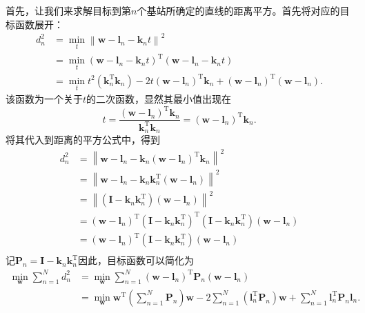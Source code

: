 首先，让我们来求解目标到第\( n \)个基站所确定的直线的距离平方。首先将对应的目标函数展开：
\[
    \begin{split}
        d_n^2 & = \min_{t} \left\| \bm{w} - \bm{l}_n - \bm{k}_n t \right\|^2                                                                                            \\
              & = \min_{t} (\bm{w} - \bm{l}_n - \bm{k}_n t)^{\mathrm{T}} (\bm{w} - \bm{l}_n - \bm{k}_n t)                                                               \\
              & = \min_{t} t^2 (\bm{k}_n^{\mathrm{T}} \bm{k}_n)  - 2 t (\bm{w} - \bm{l}_n)^{\mathrm{T}}\bm{k}_n + (\bm{w} - \bm{l}_n)^{\mathrm{T}} (\bm{w} - \bm{l}_n).
    \end{split}
\]
该函数为一个关于\( t \)的二次函数，显然其最小值出现在
\[
    t = \frac{(\bm{w} - \bm{l}_n)^{\mathrm{T}} \bm{k}_n}{\bm{k}_n^{\mathrm{T}} \bm{k}_n} = (\bm{w} - \bm{l}_n)^{\mathrm{T}} \bm{k}_n.
\]
将其代入到距离的平方公式中，得到
\[
    \begin{split}
        d_n^2 & = \left\|\bm{w} - \bm{l}_n - \bm{k}_n(\bm{w} - \bm{l}_n)^{\mathrm{T}} \bm{k}_n\right\|^2                                                                                               \\
              & = \left\| \bm{w} - \bm{l}_n - \bm{k}_n \bm{k}_n^{\mathrm{T}} (\bm{w} - \bm{l}_n) \right\|^2                                                                                            \\
              & = \left\| \left(\mathbf{I} - \bm{k}_n \bm{k}_n^{\mathrm{T}}\right) ( \bm{w} - \bm{l}_n) \right\|^2                                                                                     \\
              & = (\bm{w} - \bm{l}_n)^{\mathrm{T}} \left(\mathbf{I} - \bm{k}_n \bm{k}_n^{\mathrm{T}}\right)^{\mathrm{T}} \left(\mathbf{I} - \bm{k}_n \bm{k}_n^{\mathrm{T}}\right) ( \bm{w} - \bm{l}_n) \\
              & = (\bm{w} - \bm{l}_n)^{\mathrm{T}} \left(\mathbf{I} - \bm{k}_n \bm{k}_n^{\mathrm{T}}\right) ( \bm{w} - \bm{l}_n)                                                                       \\
    \end{split}
\]
记\( \mathbf{P}_n = \mathbf{I} - \bm{k}_n \bm{k}_n^{\mathrm{T}} \)因此，目标函数可以简化为
\[
    \begin{split}
        \min_{\bm{w}} \sum_{n=1}^{N} d_n^2 & = \min_{\bm{w}} \sum_{n=1}^{N} (\bm{w} - \bm{l}_n)^{\mathrm{T}} \mathbf{P}_n ( \bm{w} - \bm{l}_n)                                                                                                                           \\
                                           & = \min_{\bm{w}} \bm{w}^{\mathrm{T}} \left(\sum_{n=1}^{N} \mathbf{P}_n\right) \bm{w} - 2 \sum_{n=1}^{N} \left(\bm{l}_n^{\mathrm{T}} \mathbf{P}_n\right) \bm{w} + \sum_{n=1}^{N} \bm{l}_n^{\mathrm{T}} \mathbf{P}_n \bm{l}_n.
    \end{split}
\]
